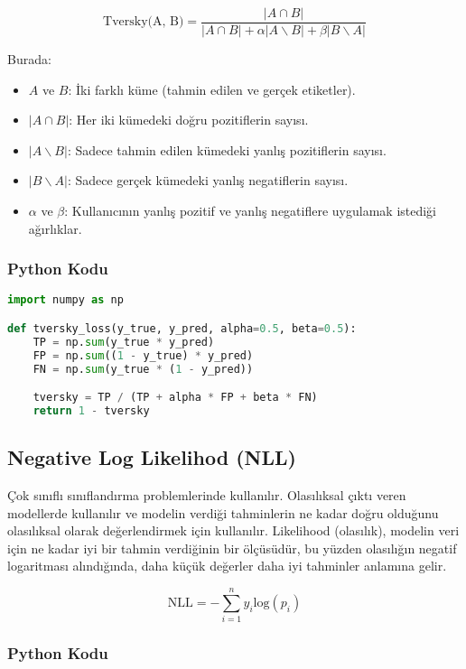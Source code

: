 \[ \text{Tversky(A, B)} = \frac{|A \cap B|}{|A \cap B| + \alpha | A \backslash B | + \beta | B \backslash A |} \]

Burada:

\begin{itemize}
    \item $A$ ve $B$: İki farklı küme (tahmin edilen ve gerçek etiketler).
    \item $|A \cap B|$: Her iki kümedeki doğru pozitiflerin sayısı.
    \item $| A \backslash B |$: Sadece tahmin edilen kümedeki yanlış pozitiflerin sayısı.
    \item $| B \backslash A |$: Sadece gerçek kümedeki yanlış negatiflerin sayısı.
    \item $\alpha$ ve $\beta$: Kullanıcının yanlış pozitif ve yanlış negatiflere uygulamak istediği ağırlıklar.
\end{itemize}

\subsubsection{Python Kodu}

\begin{lstlisting}[language=Python]
import numpy as np

def tversky_loss(y_true, y_pred, alpha=0.5, beta=0.5):
    TP = np.sum(y_true * y_pred)
    FP = np.sum((1 - y_true) * y_pred)
    FN = np.sum(y_true * (1 - y_pred))

    tversky = TP / (TP + alpha * FP + beta * FN)
    return 1 - tversky
\end{lstlisting}

\newpage

\subsection{Negative Log Likelihod (NLL)}

Çok sınıflı sınıflandırma problemlerinde kullanılır. Olasılıksal çıktı veren modellerde kullanılır ve modelin verdiği tahminlerin ne kadar doğru olduğunu olasılıksal olarak değerlendirmek için kullanılır. Likelihood (olasılık), modelin veri için ne kadar iyi bir tahmin verdiğinin bir ölçüsüdür, bu yüzden olasılığın negatif logaritması alındığında, daha küçük değerler daha iyi tahminler anlamına gelir.

\[ \text{NLL} = - \sum_{i=1}^{n} y_i \text{log}(p_i) \]

\subsubsection{Python Kodu}

